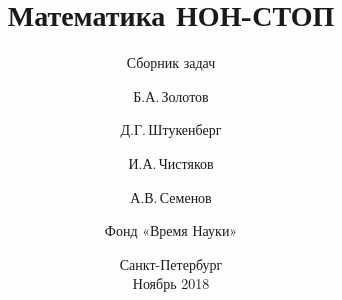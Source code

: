 \subject{\large\textrm{При поддежке Фонда Президентских грантов}
	\vspace{1in}}

\title{\fontsize{25}{25}\selectfont
	Математика НОН-СТОП}
\subtitle{\fontsize{18}{18}\selectfont
	Сборник задач
	\vspace{0.7in}}

\author{Б.А.\,Золотов \and Д.Г.\,Штукенберг \\
	\and И.А.\,Чистяков \and А.В.\,Семенов \\
	\and Фонд «Время Науки»
	\vspace{1in}}

\date{Санкт-Петербург \\ Ноябрь 2018}